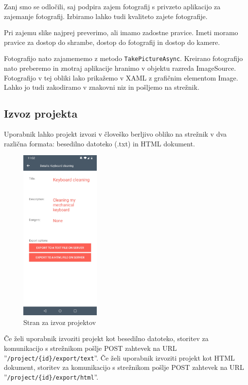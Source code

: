 \documentclass[a4paper, 12pt]{book}
\begin{document}
Zanj smo se odločili, saj podpira zajem fotografij s privzeto aplikacijo za zajemanje fotografij.
Izbiramo lahko tudi kvaliteto zajete fotografije.

Pri zajemu slike najprej preverimo, ali imamo zadostne pravice.
Imeti moramo pravice za dostop do shrambe, dostop do fotografij in dostop do kamere.

Fotografijo nato zajamememo z metodo \texttt{TakePictureAsync}.
Kreirano fotografijo nato preberemo in znotraj aplikacije hranimo v objektu razreda ImageSource.
Fotografijo v tej obliki lako prikažemo v XAML z grafičnim elementom Image.
Lahko jo tudi zakodiramo v znakovni niz in pošljemo na strežnik.


\subsection{Izvoz projekta}

Uporabnik lahko projekt izvozi v človeško berljivo obliko na strežnik v dva različna formata: besedilno datoteko (.txt) in HTML dokument.

\begin{figure}[H]
\begin{center}
	\includegraphics[width=4cm]{app_project_export}
\end{center}
	\caption{Stran za izvoz projektov}
\label{app_project_export}
\end{figure}

Če želi uporabnik izvoziti projekt kot besedilno datoteko, storitev za komunikacijo s strežnikom pošlje POST zahtevek na URL ''\texttt{/project/\{id\}/export/text}''.
Če želi uporabnik izvoziti projekt kot HTML dokument, storitev za komunikacijo s strežnikom pošlje POST zahtevek na URL ''\texttt{/project/\{id\}/export/html}''.
\end{document}
